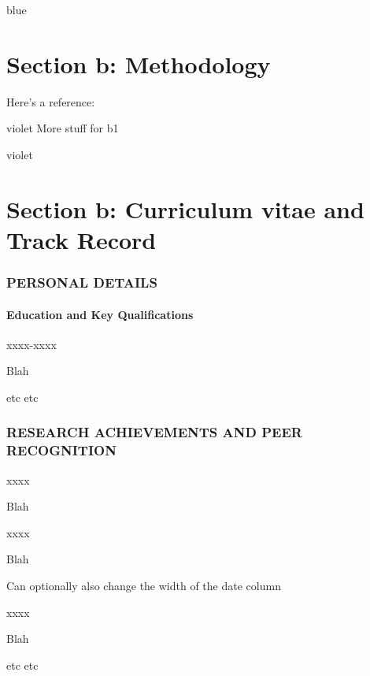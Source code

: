 \documentclass[11pt,a4paper]{article}
\newenvironment{b1}{\begin{color}{violet}}{\end{color}}
\newenvironment{b2}{\begin{color}{blue}}{\end{color}}
\newcommand{\cventry}[3][2.5cm]{%
	\par\noindent
	\begin{minipage}[t]{#1} %
		\raggedright #2
	\end{minipage}%
	\hspace{0.1cm} %
	\begin{minipage}[t]{\linewidth-#1-0.99cm} %
		#3
	\end{minipage}
	\par\vspace{1.65pt} %
}
\begin{document}
\begin{b2}
\part{Section b: Methodology}


\end{b2}

Here's a reference: \cite{texbook}
\begin{b1}
	More stuff for b1
\end{b1}







\newpage

\begin{b1}
	
\newpage
\part{Section b: Curriculum vitae and Track Record}



\section*{PERSONAL DETAILS}

\subsection*{Education and Key Qualifications}
	
\cventry{xxxx-xxxx}{Blah}

\noindent etc etc
	
\section*{RESEARCH ACHIEVEMENTS AND PEER RECOGNITION }
	
\cventry{xxxx}{Blah}
\cventry{xxxx}{Blah}

\bigskip \noindent Can optionally also change the width of the date column
\cventry[1cm]{xxxx}{Blah}

etc etc

		
\end{b1}
\end{document}
